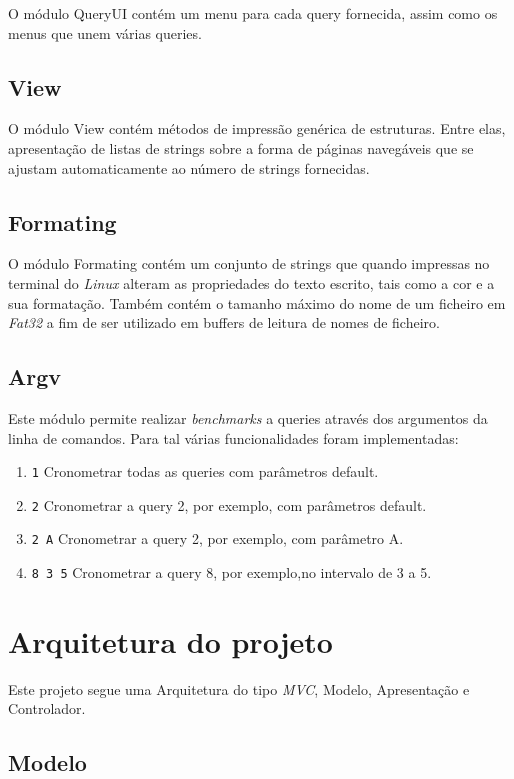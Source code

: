 \documentclass[a4paper]{report}
\begin{document}
O módulo QueryUI contém um menu para cada query fornecida, assim como os menus que unem várias queries.


\section{View}

O módulo View contém métodos de impressão genérica de estruturas. Entre elas,
apresentação de listas de strings sobre a forma de páginas navegáveis que se ajustam
automaticamente ao número de strings fornecidas.

\section{Formating}

O módulo Formating contém um conjunto de strings que quando impressas no terminal do
\textit{Linux} alteram as propriedades do texto escrito, tais como a cor e a sua formatação.
Também contém o tamanho máximo do nome de um ficheiro em \textit{Fat32} a fim de ser utilizado
em buffers de leitura de nomes de ficheiro.

\section{Argv}

Este módulo permite realizar \textit{benchmarks} a queries através dos argumentos da linha de comandos.
Para tal várias funcionalidades foram implementadas:
\begin{enumerate}
    \item \texttt{1} Cronometrar todas as queries com parâmetros default.
    \item \texttt{2} Cronometrar a query 2, por exemplo, com parâmetros default.
    \item \texttt{2 A} Cronometrar a query 2, por exemplo, com parâmetro A.
    \item \texttt{8 3 5} Cronometrar a query 8, por exemplo,no intervalo de 3 a 5.
\end{enumerate}

\chapter{Arquitetura do projeto}

Este projeto segue uma Arquitetura do tipo \textit{MVC}, Modelo, Apresentação e
Controlador.

\section{Modelo}
\end{document}
